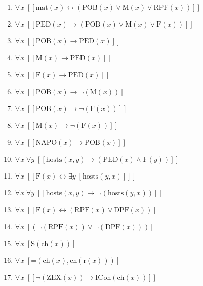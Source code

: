 \documentclass{article}
\begin{document}
\begin{enumerate}
\item $\forall x\;  \left[ \left[ \textrm{mat}(x) \leftrightarrow \left(\textrm{POB}(x) \lor \textrm{M}(x) \lor \textrm{RPF}(x)\right) \right] \right]$
\item $\forall x\;  \left[ \left[ \textrm{PED}(x) \rightarrow \left(\textrm{POB}(x) \lor \textrm{M}(x) \lor \textrm{F}(x)\right) \right] \right]$
\item $\forall x\;  \left[ \left[ \textrm{POB}(x) \rightarrow \textrm{PED}(x) \right] \right]$
\item $\forall x\;  \left[ \left[ \textrm{M}(x) \rightarrow \textrm{PED}(x) \right] \right]$
\item $\forall x\;  \left[ \left[ \textrm{F}(x) \rightarrow \textrm{PED}(x) \right] \right]$
\item $\forall x\;  \left[ \left[ \textrm{POB}(x) \rightarrow \neg \left(\textrm{M}(x)\right) \right] \right]$
\item $\forall x\;  \left[ \left[ \textrm{POB}(x) \rightarrow \neg \left(\textrm{F}(x)\right) \right] \right]$
\item $\forall x\;  \left[ \left[ \textrm{M}(x) \rightarrow \neg \left(\textrm{F}(x)\right) \right] \right]$
\item $\forall x\;  \left[ \left[ \textrm{NAPO}(x) \rightarrow \textrm{POB}(x) \right] \right]$
\item $\forall x\; \forall y\;  \left[ \left[ \textrm{hosts}(x,y) \rightarrow \left(\textrm{PED}(x) \land \textrm{F}(y)\right) \right] \right]$
\item $\forall x\;  \left[ \left[ \textrm{F}(x) \leftrightarrow \exists y\;  \left[ \textrm{hosts}(y,x) \right] \right] \right]$
\item $\forall x\; \forall y\;  \left[ \left[ \textrm{hosts}(x,y) \rightarrow \neg \left(\textrm{hosts}(y,x)\right) \right] \right]$
\item $\forall x\;  \left[ \left[ \textrm{F}(x) \leftrightarrow \left(\textrm{RPF}(x) \lor \textrm{DPF}(x)\right) \right] \right]$
\item $\forall x\;  \left[ \left(\neg \left(\textrm{RPF}(x)\right) \lor \neg \left(\textrm{DPF}(x)\right)\right) \right]$
\item $\forall x\;  \left[ \textrm{S}(\textrm{ch}(x)) \right]$
\item $\forall x\;  \left[ \textrm{=}(\textrm{ch}(x),\textrm{ch}(\textrm{r}(x))) \right]$
\item $\forall x\;  \left[ \left[ \neg \left(\textrm{ZEX}(x)\right) \rightarrow \textrm{ICon}(\textrm{ch}(x)) \right] \right]$

\end{enumerate}
\end{document}
